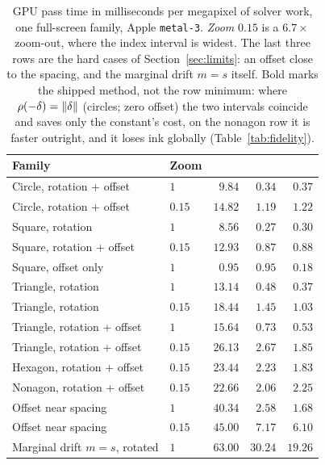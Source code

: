 \begin{table}[t]
  \centering
  \small
  \caption{GPU pass time in milliseconds per megapixel of solver work, one
  full-screen family, Apple \texttt{metal-3}. \emph{Zoom} $0.15$ is a $6.7\times$
  zoom-out, where the index interval is widest. The last three rows are the hard
  cases of Section~\ref{sec:limits}: an offset close to the spacing, and the
  marginal drift $m=s$ itself. Bold marks the shipped method, not the row minimum:
  where $\rho(-\delta)=\lVert\delta\rVert$ (circles; zero offset) the two
  intervals coincide and \loose{} saves only the constant's cost, on the nonagon
  row it is faster outright, and it loses ink globally
  (Table~\ref{tab:fidelity}).}
  \label{tab:gpu}
  \begin{tabular}{llrrr}
    \toprule
    Family & Zoom & \sweep{} & \loose{} & \ours{} \\
    \midrule
    Circle, rotation + offset & $1$ & $9.84$ & $0.34$ & $\mathbf{0.37}$ \\
    Circle, rotation + offset & $0.15$ & $14.82$ & $1.19$ & $\mathbf{1.22}$ \\
    Square, rotation & $1$ & $8.56$ & $0.27$ & $\mathbf{0.30}$ \\
    Square, rotation + offset & $0.15$ & $12.93$ & $0.87$ & $\mathbf{0.88}$ \\
    Square, offset only & $1$ & $0.95$ & $0.95$ & $\mathbf{0.18}$ \\
    Triangle, rotation & $1$ & $13.14$ & $0.48$ & $\mathbf{0.37}$ \\
    Triangle, rotation & $0.15$ & $18.44$ & $1.45$ & $\mathbf{1.03}$ \\
    Triangle, rotation + offset & $1$ & $15.64$ & $0.73$ & $\mathbf{0.53}$ \\
    Triangle, rotation + offset & $0.15$ & $26.13$ & $2.67$ & $\mathbf{1.85}$ \\
    Hexagon, rotation + offset & $0.15$ & $23.44$ & $2.23$ & $\mathbf{1.83}$ \\
    Nonagon, rotation + offset & $0.15$ & $22.66$ & $2.06$ & $\mathbf{2.25}$ \\
    \midrule
    Offset near spacing & $1$ & $40.34$ & $2.58$ & $\mathbf{1.68}$ \\
    Offset near spacing & $0.15$ & $45.00$ & $7.17$ & $\mathbf{6.10}$ \\
    Marginal drift $m=s$, rotated & $1$ & $63.00$ & $30.24$ & $\mathbf{19.26}$ \\
    \bottomrule
  \end{tabular}
\end{table}
